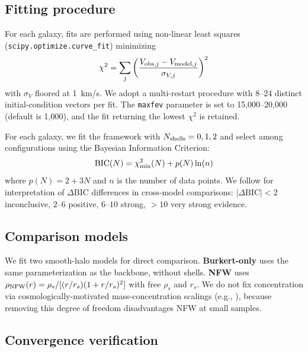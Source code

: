 \documentclass[linenumbers]{aastex701}
\begin{document}
\subsection{Fitting procedure}\label{sec:fitting}

For each galaxy, fits are performed using non-linear least squares (\texttt{scipy.optimize.curve\_fit}) minimizing
\begin{equation}
\chi^2 = \sum_j \left( \frac{V_{{\rm obs},j} - V_{{\rm model},j}}{\sigma_{V,j}} \right)^2
\end{equation}
with $\sigma_V$ floored at 1~km/s. We adopt a multi-restart procedure with 8--24 distinct initial-condition vectors per fit. The \texttt{maxfev} parameter is set to 15{,}000--20{,}000 (default is 1{,}000), and the fit returning the lowest $\chi^2$ is retained.

For each galaxy, we fit the framework with $N_{\rm shells} = 0, 1, 2$ and select among configurations using the Bayesian Information Criterion:
\begin{equation}
\mathrm{BIC}(N) = \chi^2_{\rm min}(N) + p(N) \ln(n)
\end{equation}
where $p(N) = 2 + 3N$ and $n$ is the number of data points. We follow \citet{Kass1995} for interpretation of $\Delta$BIC differences in cross-model comparisons: $|\Delta\mathrm{BIC}| < 2$ inconclusive, $2$--$6$ positive, $6$--$10$ strong, $> 10$ very strong evidence.

\subsection{Comparison models}

We fit two smooth-halo models for direct comparison. \textbf{Burkert-only} uses the same parameterization as the backbone, without shells. \textbf{NFW} \citep{NFW1996,NFW1997} uses $\rho_{\rm NFW}(r) = \rho_s / [(r/r_s)(1 + r/r_s)^2]$ with free $\rho_s$ and $r_s$. We do not fix concentration via cosmologically-motivated mass-concentration scalings (e.g., \citealt{Dutton2014}), because removing this degree of freedom disadvantages NFW at small samples.

\subsection{Convergence verification}
\end{document}
